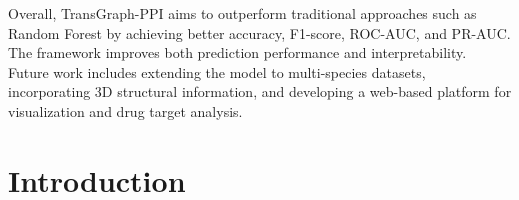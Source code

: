 \documentclass[12pt,a4paper]{report}
\begin{document}
{\noindent Overall, TransGraph-PPI aims to outperform traditional approaches such as Random Forest by achieving better accuracy, F1-score, ROC-AUC, and PR-AUC. The framework improves both prediction performance and interpretability.\\

\noindent Future work includes extending the model to multi-species datasets, incorporating 3D structural information, and developing a web-based platform for visualization and drug target analysis.\\

\vspace{-0.3cm}

}

\newpage
\renewcommand{\contentsname}{Table of Contents}
\tableofcontents
\listoffigures
{}
\listoftables
{}
\newpage

\pagestyle{fancy}
\fancyhf{}
\renewcommand{\headrulewidth}{0.5pt}
\renewcommand{\footrulewidth}{0.5pt}

\linespread{0.89}
\justifying
{}
\chapter{Introduction}
\par
\end{document}
